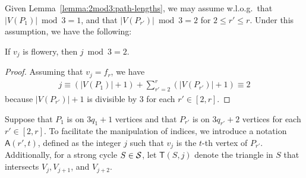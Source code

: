 Given Lemma~\ref{lemma:2mod3:path-lengths}, we may assume w.l.o.g.\ that $|V(P_1)| \bmod 3 = 1$, and that $|V(P_{r'})| \bmod 3 = 2$ for $2 \le r' \le r$.
Under this assumption, we have the following:

\begin{lemma} \label{lemma:2mod3:flowery-index}
  If $v_{j}$ is flowery, then $j \bmod 3 = 2$.
\end{lemma}
\begin{proof}
  Assuming that $v_j = f_r$, we have
  \begin{align*}
    j \equiv (|V(P_1)| + 1) + \sum_{r' = 2}^r (|V(P_{r'})| + 1) \equiv 2
  \end{align*}
  because $|V(P_{r'})| + 1$ is divisible by 3 for each $r' \in [2, r]$.
\end{proof}



\newcommand{\at}{\mathsf{A}}
\newcommand{\tria}{\mathsf{T}}
\newcommand{\scycle}{\mathsf{S}}

Suppose that $P_1$ is on $3 q_1 + 1$ vertices and that $P_{r'}$ is on $3q_{r'} + 2$ vertices for each $r' \in [2, r]$.
To facilitate the manipulation of indices, we introduce a notation $\at(r', t)$, defined as the integer $j$ such that $v_j$ is the $t$-th vertex of $P_{r'}$.
Additionally, for a strong cycle $S \in \mathcal S$, let $\tria(S, j)$ denote the triangle in $S$ that intersects $V_{j}, V_{j + 1}$, and $V_{j + 2}$.

